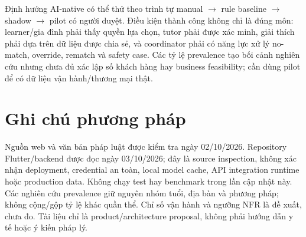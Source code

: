 \documentclass[11pt,a4paper]{article}
\begin{document}
Định hướng AI-native có thể thử theo trình tự manual \(\rightarrow\) rule baseline \(\rightarrow\) shadow \(\rightarrow\) pilot có người duyệt. Điều kiện thành công không chỉ là đúng môn: learner/gia đình phải thấy quyền lựa chọn, tutor phải được xác minh, giải thích phải dựa trên dữ liệu được chia sẻ, và coordinator phải có năng lực xử lý no-match, override, rematch và safety case. Các tỷ lệ prevalence tạo bối cảnh nghiên cứu nhưng chưa đủ xác lập số khách hàng hay business feasibility; cần dùng pilot để có dữ liệu vận hành/thương mại thật.

\section*{Ghi chú phương pháp}
Nguồn web và văn bản pháp luật được kiểm tra ngày 02/10/2026. Repository Flutter/backend được đọc ngày 03/10/2026; đây là source inspection, không xác nhận deployment, credential an toàn, local model cache, API integration runtime hoặc production data. Không chạy test hay benchmark trong lần cập nhật này. Các nghiên cứu prevalence giữ nguyên nhóm tuổi, địa bàn và phương pháp; không cộng/gộp tỷ lệ khác quần thể. Chỉ số vận hành và ngưỡng NFR là đề xuất, chưa đo. Tài liệu chỉ là product/architecture proposal, không phải hướng dẫn y tế hoặc ý kiến pháp lý.
\end{document}
